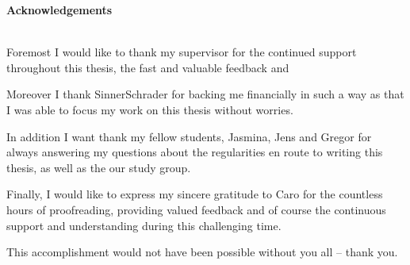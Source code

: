 \thispagestyle{empty}\thispagestyle{noheader}
\begin{large}
	\textbf{Acknowledgements} \\ \\
\end{large}

Foremost I would like to thank my supervisor \firstTutor for the continued support throughout this thesis, the fast and valuable feedback and 

Moreover I thank SinnerSchrader for backing me financially in such a way as that I was able to focus my work on this thesis without worries.

In addition I want thank my fellow students, Jasmina, Jens and Gregor for always answering my questions about the regularities en route to writing this thesis, as well as the our study group.

Finally, I would like to express my sincere gratitude to Caro for the countless hours of proofreading, providing valued feedback and of course the continuous support and understanding during this challenging time.

This accomplishment would not have been possible without you all -- thank you.

\newpage